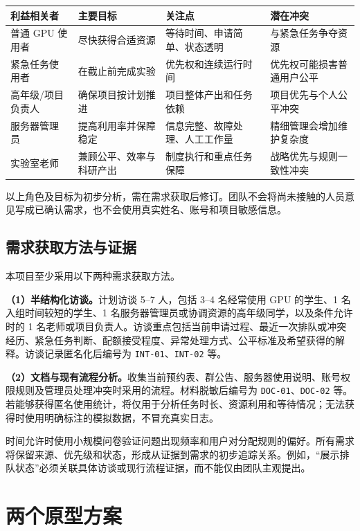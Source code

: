 \documentclass[UTF8,10.5pt,a4paper,fontset=mac]{ctexart}
\begin{document}
\begin{table}[htbp]
\centering
\small
\begin{tabularx}{\linewidth}{L{2.45cm}L{3.2cm}L{3.5cm}Y}
\toprule
\textbf{利益相关者} & \textbf{主要目标} & \textbf{关注点} & \textbf{潜在冲突} \\
\midrule
普通 GPU 使用者 & 尽快获得合适资源 & 等待时间、申请简单、状态透明 & 与紧急任务争夺资源 \\
紧急任务使用者 & 在截止前完成实验 & 优先权和连续运行时间 & 优先权可能损害普通用户公平 \\
高年级/项目负责人 & 确保项目按计划推进 & 项目整体产出和任务依赖 & 项目优先与个人公平冲突 \\
服务器管理员 & 提高利用率并保障稳定 & 信息完整、故障处理、人工工作量 & 精细管理会增加维护复杂度 \\
实验室老师 & 兼顾公平、效率与科研产出 & 制度执行和重点任务保障 & 战略优先与规则一致性冲突 \\
\bottomrule
\end{tabularx}
\end{table}

以上角色及目标为初步分析，需在需求获取后修订。团队不会将尚未接触的人员意见写成已确认需求，也不会使用真实姓名、账号和项目敏感信息。

\subsection{需求获取方法与证据}

本项目至少采用以下两种需求获取方法。

\textbf{（1）半结构化访谈。}计划访谈 5--7 人，包括 3--4 名经常使用 GPU 的学生、1 名入组时间较短的学生、1 名服务器管理员或协调资源的高年级同学，以及条件允许时的 1 名老师或项目负责人。访谈重点包括当前申请过程、最近一次排队或冲突经历、紧急任务判断、配额接受程度、异常处理方式、公平标准及希望获得的解释。访谈记录匿名化后编号为 \texttt{INT-01}、\texttt{INT-02} 等。

\textbf{（2）文档与现有流程分析。}收集当前预约表、群公告、服务器使用说明、账号权限规则及管理员处理冲突时采用的流程。材料脱敏后编号为 \texttt{DOC-01}、\texttt{DOC-02} 等。若能够获得匿名使用统计，将仅用于分析任务时长、资源利用和等待情况；无法获得时使用明确标注的模拟数据，不冒充真实日志。

时间允许时使用小规模问卷验证问题出现频率和用户对分配规则的偏好。所有需求将保留来源、优先级和状态，形成从证据到需求的初步追踪关系。例如，“展示排队状态”必须关联具体访谈或现行流程证据，而不能仅由团队主观提出。

\section{两个原型方案}
\end{document}
